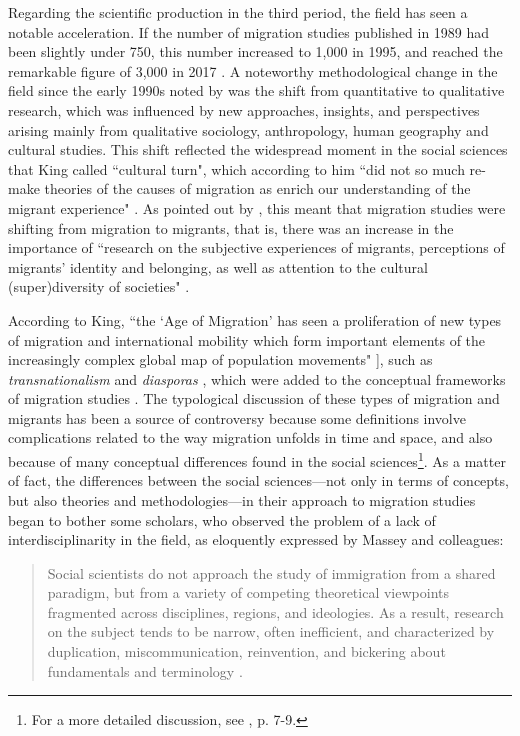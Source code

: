 Regarding the scientific production in the third period, the field has seen a notable acceleration. If the number of migration studies published in 1989 had been slightly under 750, this number increased to 1,000 in 1995, and reached the remarkable figure of 3,000 in 2017 \citep{levy_between_2020, scholten_introduction_2022}. A noteworthy methodological change in the field since the early 1990s noted by \cite{king_theories_2012} was the shift from quantitative to qualitative research, which was influenced by new approaches, insights, and perspectives arising mainly from qualitative sociology, anthropology, human geography and cultural studies. This shift reflected the widespread moment in the social sciences that King called ``cultural turn", which according to him ``did not so much re-make theories of the causes of migration as enrich our understanding of the migrant experience" \citep[p. 25]{king_theories_2012}. As pointed out by \cite{scholten_introduction_2022}, this meant that migration studies were shifting from migration to migrants, that is, there was an increase in the importance of ``research on the subjective experiences of migrants, perceptions of migrants’ identity and belonging, as well as attention to the cultural (super)diversity of societies" \citep[p. 21]{scholten_introduction_2022}.

According to King, ``the `Age of Migration' has seen a proliferation of new types of migration and international mobility which form important elements of the increasingly complex global map of population movements" \citep[p. 9]{king_theories_2012}], such as \textit{transnationalism} \citep{schiller_transnationalism_1992} and \textit{diasporas} \citep{cohen_global_2008}, which were added to the conceptual frameworks of migration studies \citep{king_theories_2012}. The typological discussion of these types of migration and migrants has been a source of controversy because some definitions involve complications related to the way migration unfolds in time and space, and also because of many conceptual differences found in the social sciences\footnote{For a more detailed discussion, see \cite{king_theories_2012}, p. 7-9.}. As a matter of fact, the differences between the social sciences---not only in terms of concepts, but also theories and methodologies---in their approach to migration studies began to bother some scholars, who observed the problem of a lack of interdisciplinarity in the field, as eloquently expressed by Massey and colleagues:

\begin{quote}
Social scientists do not approach the study of immigration from a shared paradigm, but from a variety of competing theoretical viewpoints fragmented across disciplines, regions, and ideologies. As a result, research on the subject tends to be narrow, often inefficient, and characterized by duplication, miscommunication, reinvention, and bickering about fundamentals and terminology \citep[p. 700-701]{massey_evaluation_1994}.
\end{quote}

